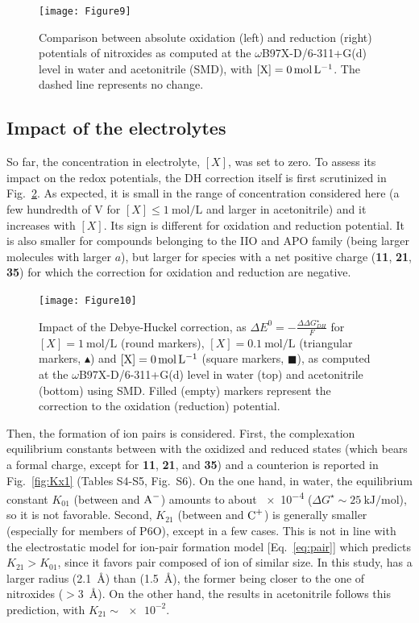 \documentclass[review]{elsarticle}
\begin{document}
\begin{figure}[!h]
	\centering
	\texttt{[image: Figure9]}
	\caption{Comparison between absolute oxidation (left) and reduction (right) potentials of nitroxides as computed at the $\omega$B97X-D/6-311+G(d) level in water and acetonitrile (SMD), with $[\ce{X}]=\SI{0}{\mole\per\liter}$. The dashed line represents no change. }
	\label{fig:watvsac}
\end{figure}

\subsection{Impact of the electrolytes}

So far, the concentration in electrolyte, $[X]$, was set to zero. To assess its impact on the redox potentials, the DH correction itself is first scrutinized in Fig.~\ref{fig:DH}. As expected, it is small in the range of concentration considered here (a few hundredth of \si{\volt} for $[X] \leq \SI{1}{\mole\per\liter}$ and larger in acetonitrile) and it increases with $[X]$. Its sign is different for oxidation and reduction potential. It is also smaller for compounds belonging to the IIO and APO family (being larger molecules with larger $a$), but larger for species with a net positive charge (\textbf{11}, \textbf{21}, \textbf{35}) for which the correction for oxidation and reduction are negative. 


\begin{figure}[!h]
	\centering
	\texttt{[image: Figure10]}
	\caption{Impact of the Debye-Huckel correction, as $\Delta E^0 = -\frac{\Delta \Delta G_{DH}^\star}{F}$ for $[X]=\SI{1}{\mole\per\liter}$ (round markers), $[X]=\SI{0.1}{\mole\per\liter}$ (triangular markers, $\blacktriangle$)  and $[\ce{X}]=\SI{0}{\mole\per\liter}$ (square markers, $\blacksquare$), as computed at the $\omega$B97X-D/6-311+G(d) level in water (top) and acetonitrile (bottom) using SMD. Filled (empty) markers represent the correction to the oxidation (reduction) potential. }
	\label{fig:DH}
\end{figure}

Then, the formation of ion pairs is considered. First, the complexation equilibrium constants between with the oxidized and reduced states (which bears a formal charge, except for \textbf{11}, \textbf{21}, and \textbf{35}) and a counterion is reported in Fig.~\ref{fig:Kx1} (Tables S4-S5, Fig.~S6). On the one hand, in water, the equilibrium constant $K_{01}$ (between  and $\ce{A-}$) amounts to about \num{e-4} ($\Delta G^\star \sim \SI{25}{\kilo\joule\per\mole}$), so it is not favorable.  Second, $K_{21}$ (between  and $\ce{C+}$) is generally smaller (especially for members of P6O), except in a few cases.  This is not in line with the electrostatic model for ion-pair formation model [Eq.~\eqref{eq:pair}]  which predicts  $K_{21} >K_{01}$, since it favors pair composed of ion of similar size. In this study,  has a larger radius (\SI{2.1}{\angstrom}) than  (\SI{1.5}{\angstrom}), the former being closer to the one of nitroxides ($>$\SI{3}{\angstrom}).  On the other hand, the results in acetonitrile follows this prediction, with $K_{21}\sim\num{e-2}$.
\end{document}
